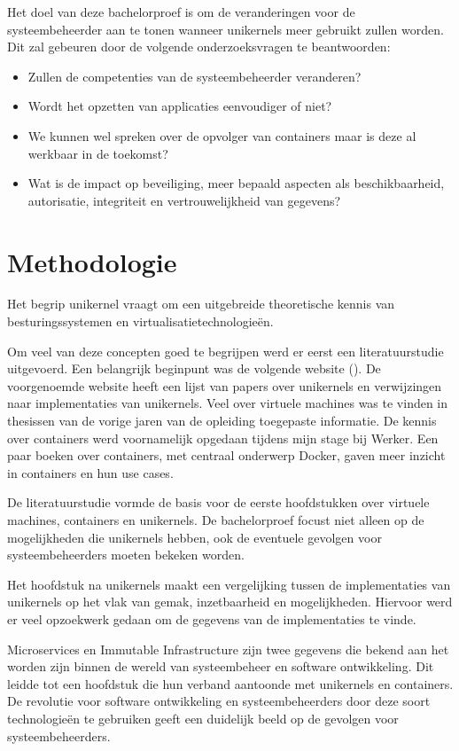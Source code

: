 \documentclass[pdftex,a4paper,12pt,twoside]{report}
\begin{document}
Het doel van deze bachelorproef is om de veranderingen voor de systeembeheerder aan te tonen wanneer unikernels meer gebruikt zullen worden.
Dit zal gebeuren door de volgende onderzoeksvragen te beantwoorden:

\begin{itemize}  
\item Zullen de competenties van de systeembeheerder veranderen?
\item Wordt het opzetten van applicaties eenvoudiger of niet?
\item We kunnen wel spreken over de opvolger van containers maar is deze al werkbaar in de toekomst?
\item Wat is de impact op beveiliging, meer bepaald aspecten als beschikbaarheid, autorisatie, integriteit en vertrouwelijkheid van gegevens?
\end{itemize}

\chapter{Methodologie}
\label{ch:methodologie}

Het begrip unikernel vraagt om een uitgebreide theoretische kennis van besturingssystemen en virtualisatietechnologieën.

Om veel van deze concepten goed te begrijpen werd er eerst een literatuurstudie uitgevoerd.
Een belangrijk beginpunt was de volgende website (\cite{unikernel_systems_unikernels_2016}). De voorgenoemde website heeft een lijst van papers over unikernels en verwijzingen naar implementaties van unikernels.
Veel over virtuele machines was te vinden in thesissen van de vorige jaren van de opleiding toegepaste informatie. De kennis over containers werd voornamelijk opgedaan tijdens mijn stage bij Werker. Een paar boeken over containers, met centraal onderwerp Docker, gaven meer inzicht in containers en hun use cases.

De literatuurstudie vormde de basis voor de eerste hoofdstukken over virtuele machines, containers en unikernels. De bachelorproef focust niet alleen op de mogelijkheden die unikernels hebben, ook de eventuele gevolgen voor systeembeheerders moeten bekeken worden.

Het hoofdstuk na unikernels maakt een vergelijking tussen de implementaties van unikernels op het vlak van gemak, inzetbaarheid en mogelijkheden. Hiervoor werd er veel opzoekwerk gedaan om de gegevens van de implementaties te vinde.

Microservices en Immutable Infrastructure zijn twee gegevens die bekend aan het worden zijn binnen de wereld van systeembeheer en software ontwikkeling. Dit leidde tot een hoofdstuk die hun verband aantoonde met unikernels en containers. De revolutie voor software ontwikkeling en systeembeheerders door deze soort technologieën te gebruiken geeft een duidelijk beeld op de gevolgen voor systeembeheerders.
\end{document}
